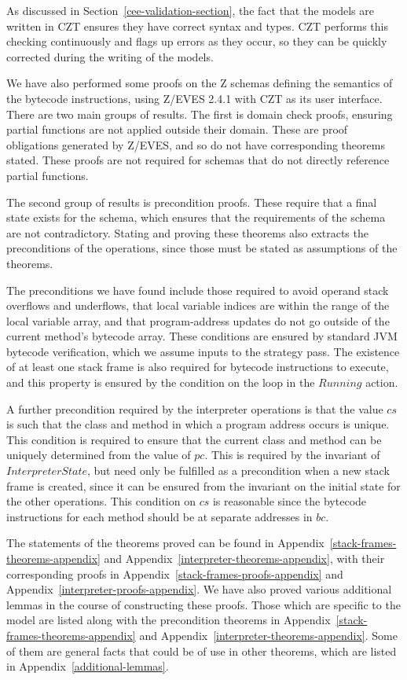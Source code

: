As discussed in Section~\ref{cee-validation-section}, the fact that
the models are written in CZT ensures they have correct syntax and
types.
CZT performs this checking continuously and flags up errors as they
occur, so they can be quickly corrected during the writing of the
models.

We have also performed some proofs on the Z schemas defining the
semantics of the bytecode instructions, using Z/EVES 2.4.1 with CZT as
its user interface.
There are two main groups of results.
The first is domain check proofs, ensuring partial functions are
not applied outside their domain.
These are proof obligations generated by Z/EVES, and so do not have
corresponding theorems stated.
These proofs are not required for schemas that do not directly
reference partial functions.

The second group of results is precondition proofs.
These require that a final state exists for the schema, which ensures
that the requirements of the schema are not contradictory.
Stating and proving these theorems also extracts the preconditions of
the operations, since those must be stated as assumptions of the
theorems.

The preconditions we have found include those required to avoid
operand stack overflows and underflows, that local variable indices
are within the range of the local variable array, and that
program-address updates do not go outside of the current method's
bytecode array.
These conditions are ensured by standard JVM bytecode verification,
which we assume inputs to the strategy pass.
The existence of at least one stack frame is also required for
bytecode instructions to execute, and this property is ensured by the
condition on the loop in the $Running$ action.

A further precondition required by the interpreter operations is that
the value $cs$ is such that the class and method in which a program
address occurs is unique.
This condition is required to ensure that the current class and method
can be uniquely determined from the value of $pc$.
This is required by the invariant of $InterpreterState$, but need only
be fulfilled as a precondition when a new stack frame is created,
since it can be ensured from the invariant on the initial state for
the other operations.
This condition on $cs$ is reasonable since the bytecode instructions
for each method should be at separate addresses in $bc$.

The statements of the theorems proved can be found in
Appendix~\ref{stack-frames-theorems-appendix} and
Appendix~\ref{interpreter-theorems-appendix}, with their corresponding
proofs in Appendix~\ref{stack-frames-proofs-appendix} and
Appendix~\ref{interpreter-proofs-appendix}.
We have also proved various additional lemmas in the course of
constructing these proofs.
Those which are specific to the model are listed along with the
precondition theorems in Appendix~\ref{stack-frames-theorems-appendix}
and Appendix~\ref{interpreter-theorems-appendix}.
Some of them are general facts that could be of use in other theorems,
which are listed in Appendix~\ref{additional-lemmas}.


